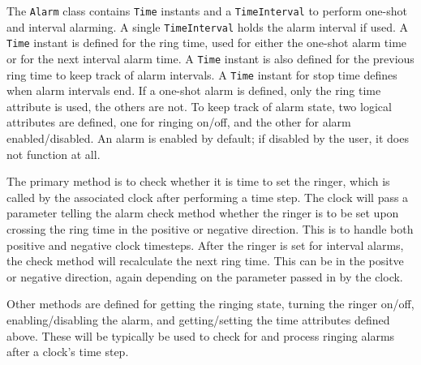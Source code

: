 
The {\tt Alarm} class contains {\tt Time} instants and a {\tt TimeInterval}
to perform one-shot and interval alarming.  A single {\tt TimeInterval}
holds the alarm interval if used.  A {\tt Time} instant is defined for the
ring time, used for either the one-shot alarm time or for the next interval
alarm time.  A {\tt Time} instant is also defined for the previous ring
time to keep track of alarm intervals.  A {\tt Time} instant for stop time
defines when alarm intervals end.  If a one-shot alarm is defined, only
the ring time attribute is used, the others are not.  To keep track of
alarm state, two logical attributes are defined, one for ringing on/off,
and the other for alarm enabled/disabled.  An alarm is enabled by default;
if disabled by the user, it does not function at all.

The primary method is to check whether it is time to set the ringer, which
is called by the associated clock after performing a time step.  The clock
will pass a parameter telling the alarm check method whether the ringer is
to be set upon crossing the ring time in the positive or negative direction.
This is to handle both positive and negative clock timesteps.  After the
ringer is set for interval alarms, the check method will recalculate the
next ring time.  This can be in the positve or negative direction, again
depending on the parameter passed in by the clock.

Other methods are defined for getting the ringing state, turning the
ringer on/off, enabling/disabling the alarm, and getting/setting the
time attributes defined above.  These will be typically be used to check for
and process ringing alarms after a clock's time step.
